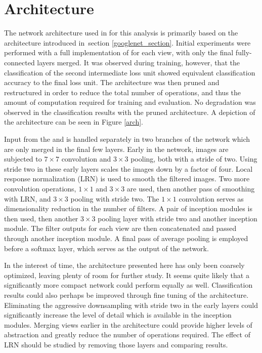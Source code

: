 \section{Architecture}

The network architecture used in for this analysis is primarily based on
the \googlenet architecture \cite{szegedy2014going} introduced in section
\ref{googlenet_section}.
Initial experiments were performed with a full implementation of \googlenet
for each view, with only the final fully-connected layers merged.
It was observed during training, however,
that the classification of the second intermediate
loss unit showed equivalent classification accuracy to the final loss unit.
The architecture was then pruned and restructured in order to reduce
the total number of operations, and thus the amount of computation required
for training and evaluation.
No degradation was observed in the classification results with the pruned
architecture.
A depiction of the architecture can be seen in Figure \ref{arch}.

Input from the \xview and \yview is handled separately in two branches of the
network which are only merged in the final few layers.
Early in the network, images are subjected to $7\times7$ convolution and
$3\times3$ pooling, both with a stride of two.
Using stride two in these early layers scales the images down by a factor of
four.
Local response normalization (LRN) \cite{krizhevsky2012imagenet} is used
to smooth the filtered images.  Two more convolution operations, $1\times1$
and $3\times3$ are used, then another pass of smoothing with LRN, and
$3\times3$ pooling with stride two.  The $1\times1$ convolution serves
as dimensionality reduction in the number of filters.
A pair of inception modules is then used, then another $3\times3$ pooling layer
with stride two and another inception module.  The filter outputs for each view
are then concatenated and passed through another inception module.  A final
pass of average pooling is employed before a softmax layer, which serves as
the output of the network.


In the interest of time, the architecture presented here has only been coarsely
optimized, leaving plenty of room for further study.
It seems quite likely that a significantly more compact network could perform
equally as well.
Classification results could also perhaps be improved through fine tuning of
the architecture.
Eliminating the aggressive downsampling with stride two in the early layers
could significantly increase the level of detail which is available in the
inception modules.
Merging views earlier in the architecture could provide higher levels of
abstraction and greatly reduce the number of operations required.
The effect of LRN should be studied by removing those layers and
comparing results.

